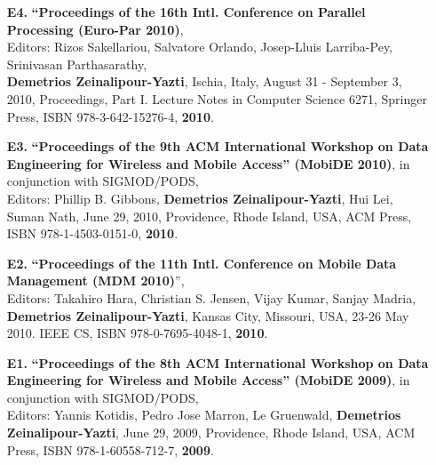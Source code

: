 \documentclass[10pt]{article}
\begin{document}
\begin{enumerate}
\item[{\bf E4.}]
\label{E4}
{\bf ``Proceedings of the
16th Intl. Conference on Parallel Processing (Euro-Par 2010)}, \\
Editors: Rizos Sakellariou, Salvatore Orlando, Josep-Lluis Larriba-Pey, Srinivasan Parthasarathy, \\ {\bf Demetrios Zeinalipour-Yazti},  Ischia, Italy, August 31 - September 3, 2010, Proceedings, Part I. Lecture Notes in Computer Science 6271, Springer Press, ISBN 978-3-642-15276-4, {\bf 2010}.

\item[{\bf E3.}]
\label{E3}
{\bf ``Proceedings of the 9th ACM International Workshop on Data Engineering for Wireless and Mobile Access'' ({\bf MobiDE 2010})}, in conjunction with SIGMOD/PODS,\\
Editors: Phillip B. Gibbons, {\bf Demetrios Zeinalipour-Yazti}, Hui Lei, Suman Nath, June 29, 2010, Providence, Rhode Island, USA, ACM Press, ISBN 978-1-4503-0151-0, {\bf 2010}.

\item[{\bf E2.}]
\label{E2}
{\bf ``Proceedings of the 11th Intl. Conference on Mobile Data Management ({\bf MDM 2010})}'', \\
Editors: Takahiro Hara, Christian S. Jensen, Vijay Kumar, Sanjay Madria,  {\bf Demetrios Zeinalipour-Yazti}, Kansas City, Missouri, USA, 23-26 May 2010. IEEE CS, ISBN 978-0-7695-4048-1, {\bf 2010}.

\item[{\bf E1.}]
\label{E1}
{\bf ``Proceedings of the 8th ACM International Workshop on Data Engineering for Wireless and Mobile Access'' (MobiDE 2009)}, in conjunction with SIGMOD/PODS, \\
Editors: Yannis Kotidis, Pedro Jose Marron, Le Gruenwald, {\bf Demetrios Zeinalipour-Yazti}, June 29, 2009, Providence, Rhode Island, USA, ACM Press, ISBN 978-1-60558-712-7, {\bf 2009}.

\end{enumerate}
\end{document}

